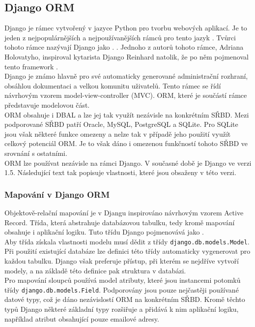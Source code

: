\documentclass[ing,male,java,dept456]{diploma}						%
\begin{document}

\subsection{Django ORM}

Django je rámec vytvořený v jazyce Python pro tvorbu webových aplikací. Je to jeden z nejpopulárnějších a nejpoužívanějších rámců pro tento jazyk \cite{pwiki}. Tvůrci tohoto rámce nazývají Django jako .  \cite{django.cz}. Jednoho z autorů tohoto rámce, Adriana Holovatyho, inspiroval kytarista Django Reinhard natolik, že po něm pojmenoval tento framework \cite{aholovaty}.  \\

Django je známo hlavně pro své automaticky generované administrační rozhraní, obsáhlou dokumentaci a velkou komunitu uživatelů. Tento rámec se řídí návrhovým vzorem model-view-controller (MVC). ORM, které je součástí rámce představuje modelovou část. \\ 
ORM obsahuje i DBAL a lze jej tak využít nezávisle na konkrétním SŘBD. Mezi podporované SŘBD patří Oracle, MySQL, PostgreSQL a SQLite. Pro SQLite jsou však některé funkce omezeny a nelze tak v případě jeho použití využít celkový potenciál ORM. Je to však dáno i omezenou funkčností tohoto SŘBD ve srovnání s ostatními. \\
ORM lze používat nezávisle na rámci Django. V současné době je Django ve verzi 1.5. Následující text tak popisuje vlastnosti, které jsou obsaženy v této verzi.

\subsubsection{Mapování v Django ORM}

Objektově-relační mapování je v Djangu inspirováno návrhovým vzorem Active Record. Třída, která abstrahuje databázovou tabulku, tedy kromě mapování obsahuje i aplikační logiku. Tuto třídu Django pojmenovává jako . \\
Aby třída získala vlastnosti modelu musí dědit z třídy \lstinline[style=custompython]|django.db.models.Model|. Při použití existující databáze lze definici této třídy automaticky vygenerovat pro každou tabulku. Django však preferuje přístup, při kterém se nejdříve vytvoří modely, a na základě této definice pak struktura v databázi. \\
Pro mapování sloupců používá model atributy, které jsou instancemi potomků třídy \lstinline[style=custompython]|django.db.models.Field|. Podporovány jsou pouze nejčastěji používané datové typy, což je dáno nezávislostí ORM na konkrétním SŘBD. Kromě těchto typů Django některé základní typy rozšiřuje a přidává k nim aplikační logiku, například atribut obsahující pouze emailové adresy. \\
\end{document}
